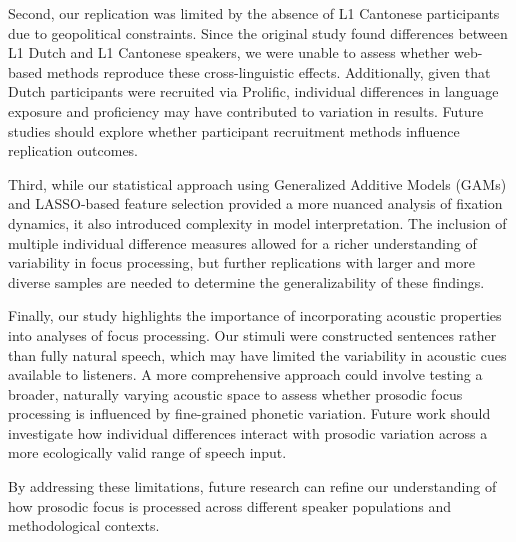 Second, our replication was limited by the absence of L1 Cantonese participants due to geopolitical constraints. Since the original study found differences between L1 Dutch and L1 Cantonese speakers, we were unable to assess whether web-based methods reproduce these cross-linguistic effects. Additionally, given that Dutch participants were recruited via Prolific, individual differences in language exposure and proficiency may have contributed to variation in results. Future studies should explore whether participant recruitment methods influence replication outcomes.

Third, while our statistical approach using Generalized Additive Models (GAMs) and LASSO-based feature selection provided a more nuanced analysis of fixation dynamics, it also introduced complexity in model interpretation. The inclusion of multiple individual difference measures allowed for a richer understanding of variability in focus processing, but further replications with larger and more diverse samples are needed to determine the generalizability of these findings.

Finally, our study highlights the importance of incorporating acoustic properties into analyses of focus processing. Our stimuli were constructed sentences rather than fully natural speech, which may have limited the variability in acoustic cues available to listeners. A more comprehensive approach could involve testing a broader, naturally varying acoustic space to assess whether prosodic focus processing is influenced by fine-grained phonetic variation. Future work should investigate how individual differences interact with prosodic variation across a more ecologically valid range of speech input.

By addressing these limitations, future research can refine our understanding of how prosodic focus is processed across different speaker populations and methodological contexts.



